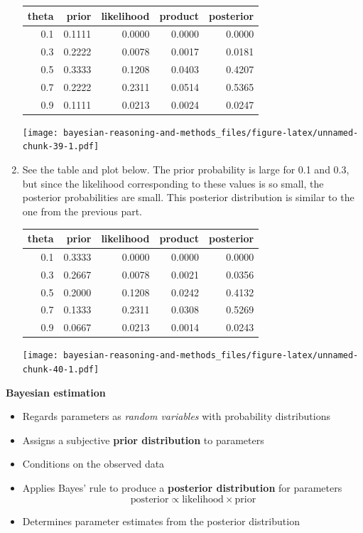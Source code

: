 \documentclass[
]{book}
\providecommand{\tightlist}{%
  \setlength{\itemsep}{0pt}\setlength{\parskip}{0pt}}
\theoremstyle{definition}
\theoremstyle{definition}
\theoremstyle{definition}
\theoremstyle{remark}
\begin{document}
\begin{enumerate}
  \begin{tabular}{r|r|r|r|r}
   \hline
   theta & prior & likelihood & product & posterior\\
   \hline
   0.1 & 0.1111 & 0.0000 & 0.0000 & 0.0000\\
   \hline
   0.3 & 0.2222 & 0.0078 & 0.0017 & 0.0181\\
   \hline
   0.5 & 0.3333 & 0.1208 & 0.0403 & 0.4207\\
   \hline
   0.7 & 0.2222 & 0.2311 & 0.0514 & 0.5365\\
   \hline
   0.9 & 0.1111 & 0.0213 & 0.0024 & 0.0247\\
   \hline
   \end{tabular}

  \texttt{[image: bayesian-reasoning-and-methods\_files/figure-latex/unnamed-chunk-39-1.pdf]}
\item
  See the table and plot below. The prior probability is large for 0.1 and 0.3, but since the likelihood corresponding to these values is so small, the posterior probabilities are small. This posterior distribution is similar to the one from the previous part.

  \begin{tabular}{r|r|r|r|r}
   \hline
   theta & prior & likelihood & product & posterior\\
   \hline
   0.1 & 0.3333 & 0.0000 & 0.0000 & 0.0000\\
   \hline
   0.3 & 0.2667 & 0.0078 & 0.0021 & 0.0356\\
   \hline
   0.5 & 0.2000 & 0.1208 & 0.0242 & 0.4132\\
   \hline
   0.7 & 0.1333 & 0.2311 & 0.0308 & 0.5269\\
   \hline
   0.9 & 0.0667 & 0.0213 & 0.0014 & 0.0243\\
   \hline
   \end{tabular}

  \texttt{[image: bayesian-reasoning-and-methods\_files/figure-latex/unnamed-chunk-40-1.pdf]}
\end{enumerate}

\textbf{Bayesian estimation}

\begin{itemize}
\tightlist
\item
  Regards parameters as \emph{random variables} with probability distributions
\item
  Assigns a subjective \textbf{prior distribution} to parameters
\item
  Conditions on the observed data
\item
  Applies Bayes' rule to produce a \textbf{posterior distribution} for parameters
  \[
  \text{posterior} \propto \text{likelihood} \times \text{prior}
  \]
\item
  Determines parameter estimates from the posterior distribution
\end{itemize}
\end{document}
